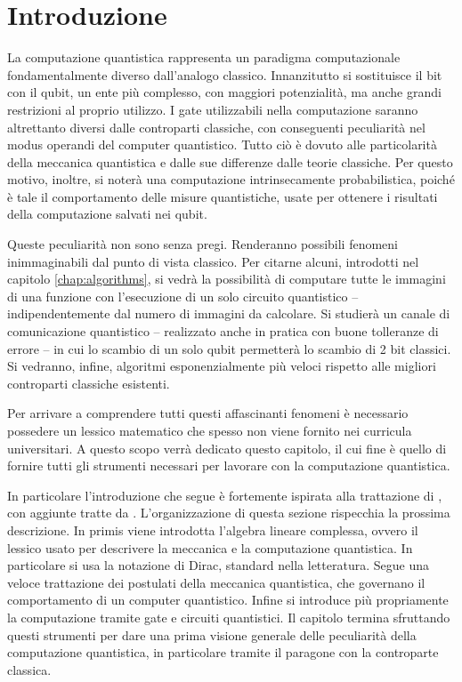 \chapter{Introduzione}\label{chap:Introduction}
La computazione quantistica rappresenta un paradigma computazionale fondamentalmente diverso dall'analogo classico.
Innanzitutto si sostituisce il bit con il qubit, un ente più complesso, con maggiori potenzialità, ma anche grandi restrizioni al proprio utilizzo.
I gate utilizzabili nella computazione saranno altrettanto diversi dalle controparti classiche, con conseguenti peculiarità nel modus operandi del computer quantistico.
Tutto ciò è dovuto alle particolarità della meccanica quantistica e dalle sue differenze dalle teorie classiche.
Per questo motivo, inoltre, si noterà una computazione intrinsecamente probabilistica, poiché è tale il comportamento delle misure quantistiche, usate per ottenere i risultati della computazione salvati nei qubit.

Queste peculiarità non sono senza pregi. Renderanno possibili fenomeni inimmaginabili dal punto di vista classico. 
Per citarne alcuni, introdotti nel capitolo \ref{chap:algorithms}, si vedrà la possibilità di computare tutte le immagini di una funzione con l'esecuzione di un solo circuito quantistico -- indipendentemente dal numero di immagini da calcolare.
Si studierà un canale di comunicazione quantistico -- realizzato anche in pratica con buone tolleranze di errore -- in cui lo scambio di un solo qubit permetterà lo scambio di 2 bit classici.
Si vedranno, infine, algoritmi esponenzialmente più veloci rispetto alle migliori controparti classiche esistenti.

Per arrivare a comprendere tutti questi affascinanti fenomeni è necessario possedere un lessico matematico che spesso non viene fornito nei curricula universitari.
A questo scopo verrà dedicato questo capitolo, il cui fine è quello di fornire tutti gli strumenti necessari per lavorare con la computazione quantistica.

In particolare l'introduzione che segue è fortemente ispirata alla trattazione di \cite{SGQC}, con aggiunte tratte da \cite{Book:QCQI}. 
L'organizzazione di questa sezione rispecchia la prossima descrizione.
In primis viene introdotta l'algebra lineare complessa, ovvero il lessico usato per descrivere la meccanica e la computazione quantistica.
In particolare si usa la notazione di Dirac, standard nella letteratura.
Segue una veloce trattazione dei postulati della meccanica quantistica, che governano il comportamento di un computer quantistico.
Infine si introduce più propriamente la computazione tramite gate e circuiti quantistici.
Il capitolo termina sfruttando questi strumenti per dare una prima visione generale delle peculiarità della computazione quantistica, in particolare tramite il paragone con la controparte classica.

